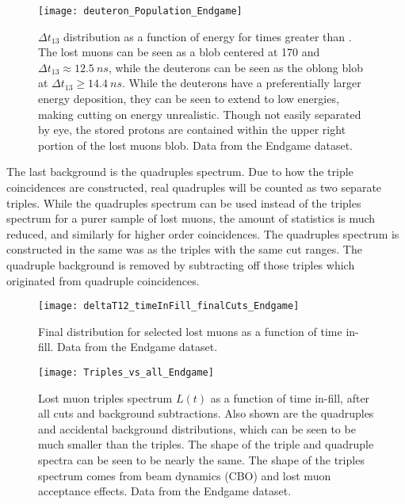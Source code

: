 \begin{figure}[]
    \centering
    \texttt{[image: deuteron\_Population\_Endgame]}
    \caption[Deuteron population at late times]{$\Delta t_{13}$ distribution as a function of energy for times greater than . The lost muons can be seen as a blob centered at 170 \MeV and $\Delta t_{13} \approx \SI{12.5}{ns}$, while the deuterons can be seen as the oblong blob at $\Delta t_{13} \geq \SI{14.4}{ns}$. While the deuterons have a preferentially larger energy deposition, they can be seen to extend to low energies, making cutting on energy unrealistic. Though not easily separated by eye, the stored protons are contained within the upper right portion of the lost muons blob. Data from the Endgame dataset.}
    \label{fig:deuteronPop}
\end{figure}


The last background is the quadruples spectrum. Due to how the triple coincidences are constructed, real quadruples will be counted as two separate triples. While the quadruples spectrum can be used instead of the triples spectrum for a purer sample of lost muons, the amount of statistics is much reduced, and similarly for higher order coincidences. The quadruples spectrum is constructed in the same was as the triples with the same cut ranges. The quadruple background is removed by subtracting off those triples which originated from quadruple coincidences.


\begin{figure}[]
    \centering
    \texttt{[image: deltaT12\_timeInFill\_finalCuts\_Endgame]}
    \caption[Final \DT distribution for selected lost muons]{Final \DT distribution for selected lost muons as a function of time in-fill. Data from the Endgame dataset.}
    \label{fig:finalDT12Dist}
\end{figure}

\begin{figure}[]
    \centering
    \texttt{[image: Triples\_vs\_all\_Endgame]}
    \caption[Lost muon triples spectrum compared to quadruples and accidental background]{Lost muon triples spectrum $L(t)$ as a function of time in-fill, after all cuts and background subtractions. Also shown are the quadruples and accidental background distributions, which can be seen to be much smaller than the triples. The shape of the triple and quadruple spectra can be seen to be nearly the same. The shape of the triples spectrum comes from beam dynamics (CBO) and lost muon acceptance effects. Data from the Endgame dataset.}
    \label{fig:triples}
\end{figure}


